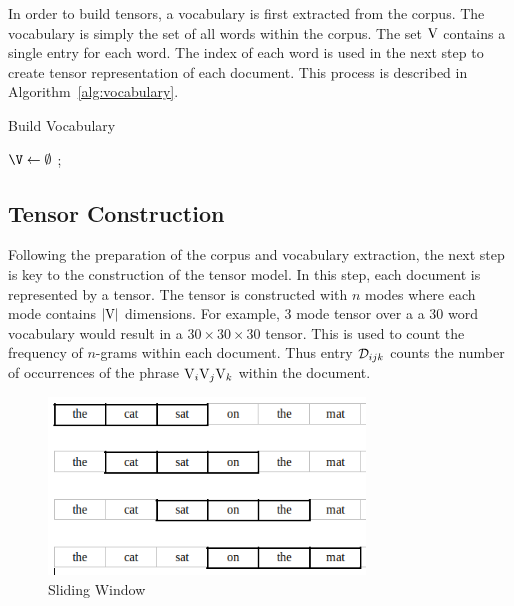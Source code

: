 \documentclass[../ut-dissertation.tex]{subfiles}
\begin{document}
In order to build tensors, a vocabulary is first extracted from the
corpus.  The vocabulary is simply the set of all words within the
corpus. The set $\mathrm{V}$ contains a single entry for each word.  The
index of each word is used in the next step to create tensor
representation of each document. This process is described in
Algorithm~\ref{alg:vocabulary}.
\begin{algorithm}
  \caption{Build Vocabulary}
  \label{alg:vocabulary}
  \Output{\V}
  \BlankLine
  $\V\leftarrow\emptyset$\;
  \Return{\V};
\end{algorithm}

\subsection{Tensor Construction}
Following the preparation of the corpus and vocabulary extraction, the
next step is key to the construction of the tensor model.  In this
step, each document is represented by a tensor.  The tensor is
constructed with $n$ modes where each mode contains $|\mathrm{V}|$
dimensions.  For example, 3 mode tensor over a a 30 word vocabulary
would result in a $30 \times 30 \times 30$ tensor. This is used to
count the frequency of $n$-grams within each document.  Thus entry
$\mathcal{D}_{ijk}$ counts the number of occurrences of the phrase
$\mathrm{V}_i \mathrm{V}_j \mathrm{V}_k$ within the document.

\begin{figure}[p]
  \begin{center}
    \includegraphics[width=0.75\textwidth]{diagrams/sliding-window}
  \end{center}
  \caption{Sliding Window}
  \label{fig:SlidingWindow}
\end{figure}
\end{document}
